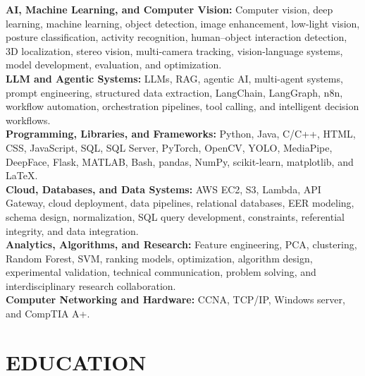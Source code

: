 \documentclass[10pt,a4paper,sans]{moderncv}
\begin{document}
{\textbf{AI, Machine Learning, and Computer Vision:}
Computer vision, deep learning, machine learning, object detection, image enhancement, low-light vision, posture classification, activity recognition, human--object interaction detection, 3D localization, stereo vision, multi-camera tracking, vision-language systems, model development, evaluation, and optimization.
}\\[5pt]
{\textbf{LLM and Agentic Systems:}
LLMs, RAG, agentic AI, multi-agent systems, prompt engineering, structured data extraction, LangChain, LangGraph, n8n, workflow automation, orchestration pipelines, tool calling, and intelligent decision workflows.
}\\[5pt]
{\textbf{Programming, Libraries, and Frameworks:}
Python, Java, C/C++, HTML, CSS, JavaScript, SQL, SQL Server, PyTorch, OpenCV, YOLO, MediaPipe, DeepFace, Flask, MATLAB, Bash, pandas, NumPy, scikit-learn, matplotlib, and LaTeX.
}\\[5pt]
{\textbf{Cloud, Databases, and Data Systems:}
AWS EC2, S3, Lambda, API Gateway, cloud deployment, data pipelines, relational databases, EER modeling, schema design, normalization, SQL query development, constraints, referential integrity, and data integration.
}\\[5pt]
{\textbf{Analytics, Algorithms, and Research:}
Feature engineering, PCA, clustering, Random Forest, SVM, ranking models, optimization, algorithm design, experimental validation, technical communication, problem solving, and interdisciplinary research collaboration.
}\\[5pt]
{\textbf{Computer Networking and Hardware:}
CCNA, TCP/IP, Windows server, and CompTIA A+.
}

\vspace*{-3mm}
\section{EDUCATION}
\end{document}
